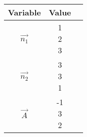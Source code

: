 \begin{center}
    \begin{tabular}{|c|c|c|} 
        \hline
            \textbf{Variable}  & \textbf{Value} \\ 
        \hline
            $\vec{n_1}$  & \myvec{1\\2\\3} \\ 
        \hline
            $\vec{n_2}$  & \myvec{3\\3\\1}\\ 
        \hline
            $\vec{A}$  &   \myvec{-1\\3\\2}   \\
        \hline
    \end{tabular}
\end{center}  

